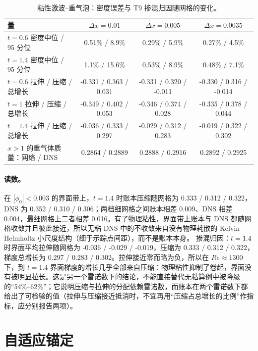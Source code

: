 \begin{table}[!htbp]\centering\small\caption{粘性激波–重气泡：密度误差与 T9 掺混归因随网格的变化。}
\begin{tabular}{lccc}\toprule 量 & $\Delta x=0.01$ & $\Delta x=0.005$ & $\Delta x=0.0035$\\\midrule
$t=0.6$ 密度中位 / 95 分位 & 0.51\% / 8.9\% & 0.29\% / 5.9\% & 0.27\% / 4.5\%\\
$t=1.4$ 密度中位 / 95 分位 & 1.1\% / 15.6\% & 0.53\% / 8.9\% & 0.48\% / 7.1\%\\
$t=0.6$ 拉伸 / 压缩 / 总增长 & -0.331 / 0.363 / 0.031 & -0.331 / 0.320 / -0.011 & -0.330 / 0.316 / -0.014\\
$t=1$ 拉伸 / 压缩 / 总增长 & -0.349 / 0.402 / 0.053 & -0.346 / 0.374 / 0.028 & -0.335 / 0.378 / 0.044\\
$t=1.4$ 拉伸 / 压缩 / 总增长 & -0.036 / 0.333 / 0.297 & -0.029 / 0.312 / 0.283 & -0.019 / 0.322 / 0.302\\
$x>1$ 的重气体质量：网络 / DNS & 0.2864 / 0.2889 & 0.2888 / 0.2916 & 0.2892 / 0.2925\\\bottomrule\end{tabular}\end{table}
\paragraph{读数。}在 $|\phi_0|<0.003$ 的界面带上，$t=1.4$ 时账本压缩随网格为 0.333 / 0.312 / 0.322，DNS 为 0.352 / 0.310 / 0.306；两档细网格之间账本相差 0.009、DNS 相差 0.004，最细网格上二者相差 0.016。有了物理粘性，界面带上账本与 DNS 都随网格收敛并且彼此接近，所以无粘 DNS 中的不收敛来自没有物理耗散的 Kelvin–Helmholtz 小尺度结构（细于示踪点间距），而不是账本本身。 掺混归因：$t=1.4$ 时界面平均拉伸随网格为 -0.036 / -0.029 / -0.019，压缩为 0.333 / 0.312 / 0.322，梯度总增长为 0.297 / 0.283 / 0.302。拉伸接近零而略为负，所以在 $Re\approx1300$ 下，到 $t=1.4$ 界面梯度的增长几乎全部来自压缩：物理粘性抑制了卷起，界面没有被明显拉长。这是另一个雷诺数下的结论，不能直接替代无粘算例中被降级的“54\%–62\%”；它说明压缩与拉伸的分配依赖雷诺数，而账本在两个雷诺数下都给出了可检验的值（拉伸与压缩接近抵消时，不宜再用“压缩占总增长的比例”作指标，应分别报告两项）。
\section{自适应锚定}
